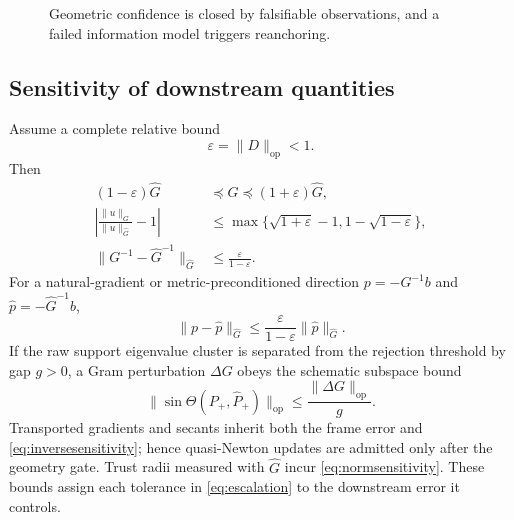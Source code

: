 \documentclass[10pt,twocolumn]{article}
\theoremstyle{definition}
\theoremstyle{remark}
\newcommand{\op}{\mathrm{op}}
\begin{document}
\begin{figure}[t]
\centering
{}
\caption{Geometric confidence is closed by falsifiable observations, and a failed information model triggers reanchoring.}
\label{fig:closurecycle}
\end{figure}

\subsection{Sensitivity of downstream quantities}

Assume a complete relative bound
\begin{equation}
 \varepsilon=\|D\|_{\op}<1.
 \label{eq:epsiloncomplete}
\end{equation}
Then
\begin{align}
 (1-\varepsilon)\widehat G&\preceq G\preceq(1+\varepsilon)\widehat G,
 \label{eq:metricorder}\\
 \left|\frac{\|u\|_G}{\|u\|_{\widehat G}}-1\right|
 &\le\max\{\sqrt{1+\varepsilon}-1,1-\sqrt{1-\varepsilon}\},
 \label{eq:normsensitivity}\\
 \|G^{-1}-\widehat G^{-1}\|_{\widehat G}
 &\le\frac{\varepsilon}{1-\varepsilon}.
 \label{eq:inversesensitivity}
\end{align}
For a natural-gradient or metric-preconditioned direction $p=-G^{-1}b$ and $\widehat p=-\widehat G^{-1}b$,
\begin{equation}
 \|p-\widehat p\|_{\widehat G}
 \le\frac{\varepsilon}{1-\varepsilon}\|\widehat p\|_{\widehat G}.
 \label{eq:stepsensitivity}
\end{equation}
If the raw support eigenvalue cluster is separated from the rejection threshold by gap $g>0$, a Gram perturbation $\Delta G$ obeys the schematic subspace bound
\begin{equation}
 \|\sin\Theta(P_+,\widehat P_+)\|_{\op}
 \le\frac{\|\Delta G\|_{\op}}{g}.
 \label{eq:daviskahan}
\end{equation}
Transported gradients and secants inherit both the frame error and \eqref{eq:inversesensitivity}; hence quasi-Newton updates are admitted only after the geometry gate.  Trust radii measured with $\widehat G$ incur \eqref{eq:normsensitivity}.  These bounds assign each tolerance in \eqref{eq:escalation} to the downstream error it controls.
\end{document}
